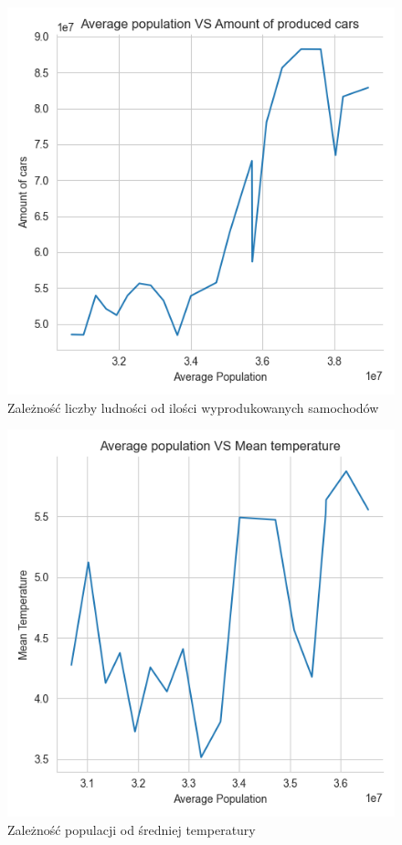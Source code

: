 \documentclass[9pt,a4paper,twoside]{rho}
\begin{document}
        \begin{figure}[H]
            \centering
            \includegraphics[width=1\columnwidth]{plots/Average population VS Amount of produced cars.png}
            \caption{Zależność liczby ludności od ilości wyprodukowanych samochodów}
            \label{fig:population_vs_produced_cars}
        \end{figure}
        
        \begin{figure}[H]
            \centering
            \includegraphics[width=1\columnwidth]{plots/Average population VS Mean temperature.png}
            \caption{Zależność populacji od średniej temperatury}
            \label{fig:population_vs_mean_temp}
        \end{figure}
    
\end{document}
